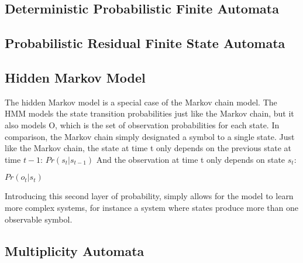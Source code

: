 \subsection{Deterministic Probabilistic Finite Automata}
\subsection{Probabilistic Residual Finite State Automata}

%


\subsection{Hidden Markov Model}
The hidden Markov model is a special case of the Markov chain model. The HMM models the state transition probabilities just like the Markov chain, but it also models O, which is the set of observation probabilities for each state. In comparison, the Markov chain simply designated a symbol to a single state.
Just like the Markov chain, the state at time t only depends on the previous state at time $t-1$: $Pr(s_t | s_{t-1})$
And the observation at time t only depends on state $s_t$:
\begin{description}
\item $Pr(o_t | s_t)$
\end{description}


Introducing this second layer of probability, simply allows for the model to learn more complex systems, for instance a system where states produce more than one observable symbol. \cite{poole2010artificial}

\subsection{Multiplicity Automata}


